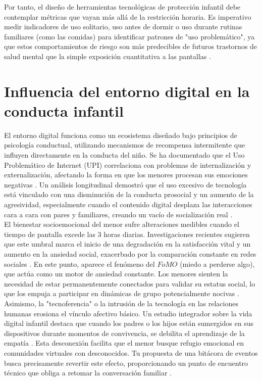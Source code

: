 Por tanto, el diseño de herramientas tecnológicas de protección infantil debe contemplar métricas que vayan más allá de la restricción horaria. Es imperativo medir indicadores de uso solitario, uso antes de dormir o uso durante rutinas familiares (como las comidas) para identificar patrones de "uso problemático", ya que estos comportamientos de riesgo son más predecibles de futuros trastornos de salud mental que la simple exposición cuantitativa a las pantallas \cite{selak_problematic_2025}.\\

\section{Influencia del entorno digital en la conducta infantil}

El entorno digital funciona como un ecosistema diseñado bajo principios de psicología conductual, utilizando mecanismos de recompensa intermitente que influyen directamente en la conducta del niño. Se ha documentado que el Uso Problemático de Internet (UPI) correlaciona con problemas de internalización y externalización, afectando la forma en que los menores procesan sus emociones negativas \cite{bohnert_emerging_2021}. Un análisis longitudinal demostró que el uso excesivo de tecnología está vinculado con una disminución de la conducta prosocial y un aumento de la agresividad, especialmente cuando el contenido digital desplaza las interacciones cara a cara con pares y familiares, creando un vacío de socialización real \cite{masri-zada_impact_2025}. \\

El bienestar socioemocional del menor sufre alteraciones medibles cuando el tiempo de pantalla excede las 3 horas diarias. Investigaciones recientes sugieren que este umbral marca el inicio de una degradación en la satisfacción vital y un aumento en la ansiedad social, exacerbado por la comparación constante en redes sociales \cite{soriano-molina_association_2025, limone_psychological_2021, celestino_smart_2025}. En este punto, aparece el fenómeno del $FoMO$ (miedo a perderse algo), que actúa como un motor de ansiedad constante. Los menores sienten la necesidad de estar permanentemente conectados para validar su estatus social, lo que los empuja a participar en dinámicas de grupo potencialmente nocivas \cite{yusuf_lets_2023, holmarsdottir_integrative_2025}. \\

Asimismo, la "tecnoferencia" o la intrusión de la tecnología en las relaciones humanas erosiona el vínculo afectivo básico. Un estudio integrador sobre la vida digital infantil destaca que cuando los padres o los hijos están sumergidos en sus dispositivos durante momentos de convivencia, se debilita el aprendizaje de la empatía \cite{selak_problematic_2025, soriano-molina_association_2025}. Esta desconexión facilita que el menor busque refugio emocional en comunidades virtuales con desconocidos. Tu propuesta de una bitácora de eventos busca precisamente revertir este efecto, proporcionando un punto de encuentro técnico que obliga a retomar la conversación familiar \cite{stoilova_parental_2024, theopilus_parental_2025}. \\

